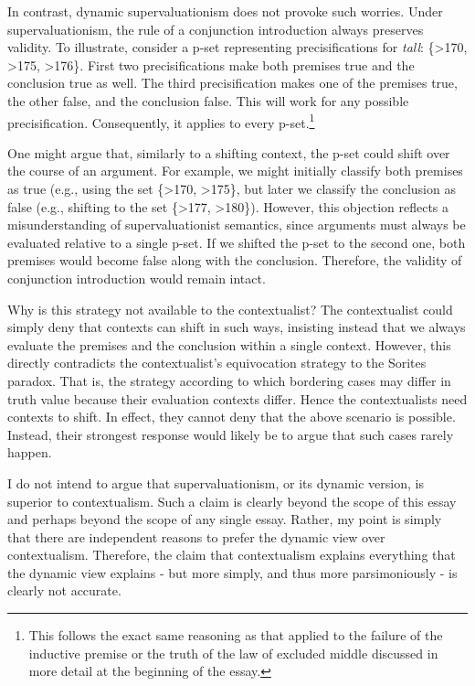 In contrast, dynamic supervaluationism does not provoke such worries.
Under supervaluationism, the rule of a conjunction introduction always
preserves validity. To illustrate, consider a p-set representing
precisifications for \emph{tall}: \{\textgreater170, \textgreater175,
\textgreater176\}. First two precisifications make both premises true
and the conclusion true as well. The third precisification makes one of
the premises true, the other false, and the conclusion false. This will
work for any possible precisification. Consequently, it applies to every
p-set.\footnote{This follows the exact same reasoning as that applied to
  the failure of the inductive premise or the truth of the law of
  excluded middle discussed in more detail at the beginning of the
  essay.}

One might argue that, similarly to a shifting context, the p-set could
shift over the course of an argument. For example, we might initially
classify both premises as true (e.g., using the set \{\textgreater170,
\textgreater175\}, but later we classify the conclusion as false (e.g.,
shifting to the set \{\textgreater177, \textgreater180\}). However, this
objection reflects a misunderstanding of supervaluationist semantics,
since arguments must always be evaluated relative to a single p-set. If
we shifted the p-set to the second one, both premises would become false
along with the conclusion. Therefore, the validity of conjunction
introduction would remain intact.

Why is this strategy not available to the contextualist? The
contextualist could simply deny that contexts can shift in such ways,
insisting instead that we always evaluate the premises and the
conclusion within a single context. However, this directly contradicts
the contextualist's equivocation strategy to the Sorites paradox. That
is, the strategy according to which bordering cases may differ in truth
value because their evaluation contexts differ. Hence the contextualists
need contexts to shift. In effect, they cannot deny that the above
scenario is possible. Instead, their strongest response would likely be
to argue that such cases rarely happen.

I do not intend to argue that supervaluationism, or its dynamic version,
is superior to contextualism. Such a claim is clearly beyond the scope
of this essay and perhaps beyond the scope of any single essay. Rather,
my point is simply that there are independent reasons to prefer the
dynamic view over contextualism. Therefore, the claim that contextualism
explains everything that the dynamic view explains - but more simply,
and thus more parsimoniously - is clearly not accurate.

